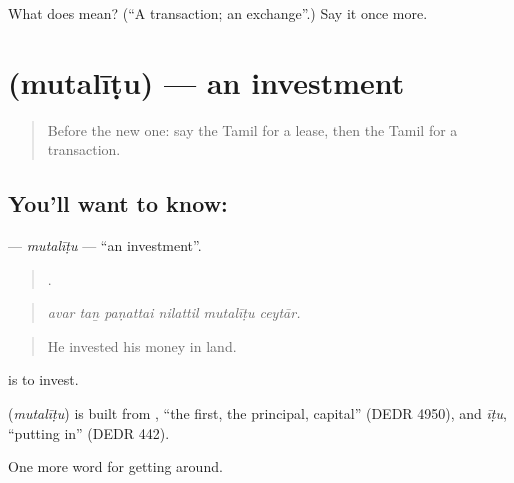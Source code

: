 \begin{tcolorbox}[breakable,colback=teal!4,colframe=teal!35!black,title={Before you move on}]
What does  mean? (\textquotedblleft{}A transaction; an exchange\textquotedblright{}.) Say it once more.
\end{tcolorbox}
\section[\texorpdfstring{\ta{முதலீடு} (mutalīṭu)}{முதலீடு (mutalīṭu)}]{ (mutalīṭu) — an investment}

\label{lesson:TA-C449-mutalitu}



\begin{quote}
Before the new one: say the Tamil for a lease, then the Tamil for a transaction.
\end{quote}

\subsection*{You'll want to know: }
\textbf{} — \emph{mutalīṭu} — \textquotedblleft{}an investment\textquotedblright{}.

\begin{quote}
     .
\end{quote}

\begin{quote}
\emph{avar taṉ paṇattai nilattil mutalīṭu ceytār.}
\end{quote}

\begin{quote}
He invested his money in land.
\end{quote}

  is to invest.

\begin{cousinweb}
\textbf{} (\emph{mutalīṭu}) is built from , \textquotedblleft{}the first, the principal, capital\textquotedblright{} (DEDR 4950), and \emph{īṭu}, \textquotedblleft{}putting in\textquotedblright{} (DEDR 442).
\end{cousinweb}

\begin{grammarlens}[title={What you've built}]
One more word for getting around.
\end{grammarlens}

